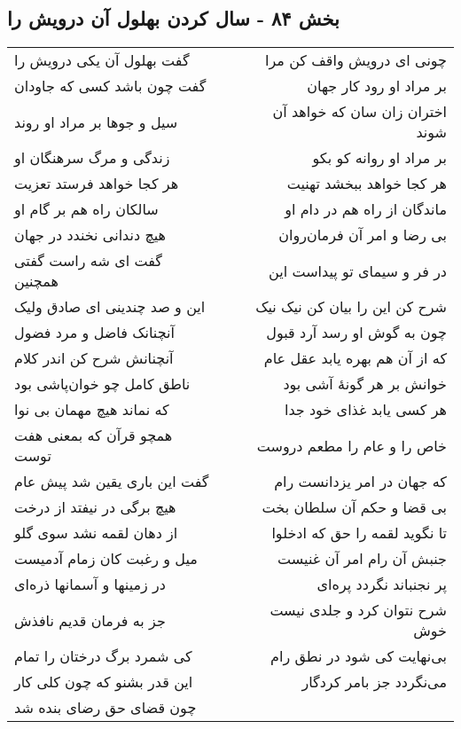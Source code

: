 \begin{center}
\section*{بخش ۸۴ - سال کردن بهلول آن درویش را}
\label{sec:sh084}
\begin{longtable}{l p{0.5cm} r}
گفت بهلول آن یکی درویش را
&&
چونی ای درویش واقف کن مرا
\\
گفت چون باشد کسی که جاودان
&&
بر مراد او رود کار جهان
\\
سیل و جوها بر مراد او روند
&&
اختران زان سان که خواهد آن شوند
\\
زندگی و مرگ سرهنگان او
&&
بر مراد او روانه کو بکو
\\
هر کجا خواهد فرستد تعزیت
&&
هر کجا خواهد ببخشد تهنیت
\\
سالکان راه هم بر گام او
&&
ماندگان از راه هم در دام او
\\
هیچ دندانی نخندد در جهان
&&
بی رضا و امر آن فرمان‌روان
\\
گفت ای شه راست گفتی همچنین
&&
در فر و سیمای تو پیداست این
\\
این و صد چندینی ای صادق ولیک
&&
شرح کن این را بیان کن نیک نیک
\\
آنچنانک فاضل و مرد فضول
&&
چون به گوش او رسد آرد قبول
\\
آنچنانش شرح کن اندر کلام
&&
که از آن هم بهره یابد عقل عام
\\
ناطق کامل چو خوان‌پاشی بود
&&
خوانش بر هر گونهٔ آشی بود
\\
که نماند هیچ مهمان بی نوا
&&
هر کسی یابد غذای خود جدا
\\
همچو قرآن که بمعنی هفت توست
&&
خاص را و عام را مطعم دروست
\\
گفت این باری یقین شد پیش عام
&&
که جهان در امر یزدانست رام
\\
هیچ برگی در نیفتد از درخت
&&
بی قضا و حکم آن سلطان بخت
\\
از دهان لقمه نشد سوی گلو
&&
تا نگوید لقمه را حق که ادخلوا
\\
میل و رغبت کان زمام آدمیست
&&
جنبش آن رام امر آن غنیست
\\
در زمینها و آسمانها ذره‌ای
&&
پر نجنباند نگردد پره‌ای
\\
جز به فرمان قدیم نافذش
&&
شرح نتوان کرد و جلدی نیست خوش
\\
کی شمرد برگ درختان را تمام
&&
بی‌نهایت کی شود در نطق رام
\\
این قدر بشنو که چون کلی کار
&&
می‌نگردد جز بامر کردگار
\\
چون قضای حق رضای بنده شد

\end{longtable}
\end{center}
